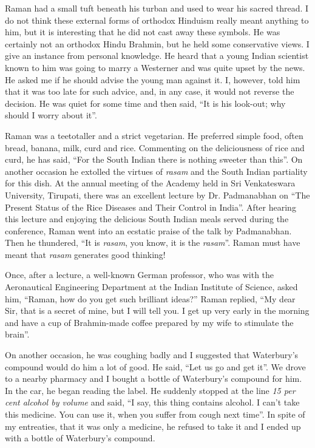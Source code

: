 Raman had a small tuft beneath his turban and used to wear his sacred thread. I do not think these external forms of orthodox Hinduism really meant anything to him, but it is interesting that he did not cast away these symbols. He was certainly not an orthodox Hindu Brahmin, but he held some conservative views. I give an instance from personal knowledge. He heard that a young Indian scientist known to him was going to marry a Westerner and was quite upset by the news. He asked me if he should advise the young man against it. I, however, told him that it was too late for such advice, and, in any case, it would not reverse the decision. He was quiet for some time and then said, ``It is his look-out; why should I worry about it''.

Raman was a teetotaller and a strict vegetarian. He preferred simple food, often bread, banana, milk, curd and rice. Commenting on the deliciousness of rice and curd, he has said, ``For the South Indian there is nothing sweeter than this''. On another occasion he extolled the virtues of {\em rasam} and the South Indian partiality for this dish. At the annual meeting of the Academy held in Sri Venkateswara University, Tirupati, there was an excellent lecture by Dr. Padmanabhan on ``The Present Status of the Rice Diseases and Their Control in India''. After hearing this lecture and enjoying the delicious South Indian meals served during the conference, Raman went into an ecstatic praise of the talk by Padmanabhan. Then he thundered, ``It is {\em rasam}, you know, it is the {\em rasam}''. Raman must have meant that {\em rasam} generates good thinking!

Once, after a lecture, a well-known German professor, who was with the Aeronautical Engineering Department at the Indian Institute of Science, asked him, ``Raman, how do you get such brilliant ideas?'' Raman replied, ``My dear Sir, that is a secret of mine, but I will tell you. I get up very early in the morning and have a cup of Brahmin-made coffee prepared by my wife to stimulate the brain''.

On another occasion, he was coughing badly and I suggested that Waterbury's compound would do him a lot of good. He said, ``Let us go and get it''. We drove to a nearby pharmacy and I bought a bottle of Waterbury's compound for him. In the car, he began reading the label. He suddenly stopped at the line {\em 15 per cent alcohol by volume} and said, ``I say, this thing contains alcohol. I can't take this medicine. You can use it, when you suffer from cough next time''. In spite of my entreaties, that it was only a medicine, he refused to take it and I ended up with a bottle of Waterbury's compound.

